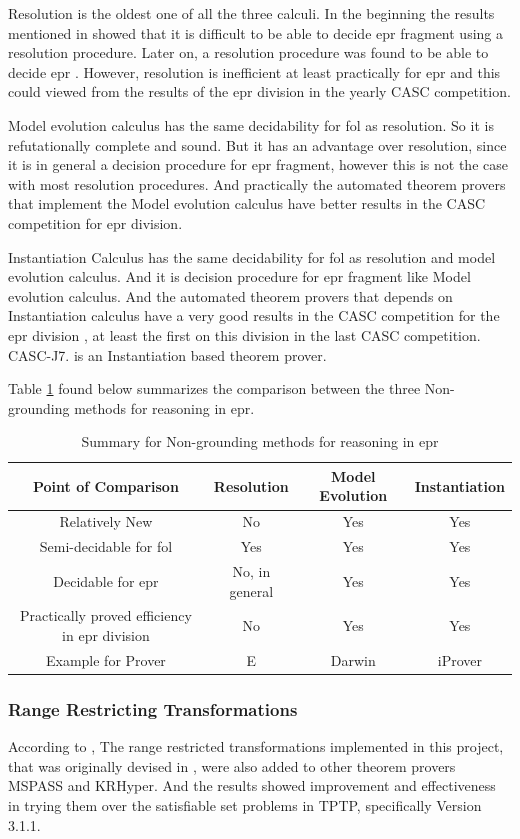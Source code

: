Resolution is the oldest one of all the three calculi. In the beginning the results mentioned in \cite{RES76} showed that it is difficult to be able to decide \ac{epr} fragment using a resolution procedure. Later on, a resolution procedure was found to be able to decide \ac{epr} \cite{RES93}. However, resolution is inefficient at least practically for \ac{epr} and this could viewed from the results of the \ac{epr} division in the yearly CASC competition.   	   


Model evolution calculus has the same decidability for \ac{fol} as resolution. So it is refutationally complete and sound. But it has an advantage over resolution, since it is in general a decision procedure for \ac{epr} fragment, however this is not the case with most resolution procedures. And practically the automated theorem provers that implement the Model evolution calculus have better results in the CASC competition for \ac{epr} division.


Instantiation Calculus has the same decidability for \ac{fol} as resolution and model evolution calculus. And it is decision procedure for \ac{epr} fragment like Model evolution calculus. And the automated theorem provers that depends on Instantiation calculus have a very good results in the CASC competition for the \ac{epr} division \cite{CASC_24,CASC_J7}, at least the first on this division in the last CASC competition. CASC-J7. is an Instantiation based theorem prover.

 
Table \ref{table:cal_comp} found below summarizes the comparison between the three Non-grounding methods for reasoning in \ac{epr}.

	\begin{table}[H]
		\centering
		\begin{tabular}{||c | c | c | c||} 
 			\hline
			Point of Comparison & Resolution & Model Evolution & Instantiation \\ %
 			\hline\hline
			Relatively New & No & Yes & Yes \\
			Semi-decidable for \ac{fol} & Yes & Yes & Yes \\
			Decidable for \ac{epr} & No, in general & Yes & Yes \\
			Practically proved efficiency in \ac{epr} division & No & Yes & Yes \\ 
			Example for Prover	& E	& Darwin		& iProver \\ [1ex] 
 			\hline
		\end{tabular}
		\caption{Summary for Non-grounding methods for reasoning in \ac{epr}}
		\label{table:cal_comp}
	\end{table}



\subsubsection{Range Restricting Transformations}
According to \cite{BMUG06}, The range restricted transformations implemented in this project, that was originally devised in \cite{BMUG06}, were also added to other theorem provers MSPASS and KRHyper. And the results showed improvement and effectiveness in trying them over the satisfiable set problems in TPTP, specifically Version 3.1.1.   

